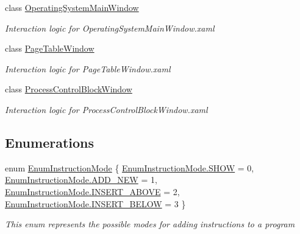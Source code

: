 \begin{DoxyCompactItemize}
class \hyperlink{class_c_p_u___o_s___simulator_1_1_operating_system_main_window}{Operating\+System\+Main\+Window}
\begin{DoxyCompactList}\small\item\em Interaction logic for Operating\+System\+Main\+Window.\+xaml \end{DoxyCompactList}\item 
class \hyperlink{class_c_p_u___o_s___simulator_1_1_page_table_window}{Page\+Table\+Window}
\begin{DoxyCompactList}\small\item\em Interaction logic for Page\+Table\+Window.\+xaml \end{DoxyCompactList}\item 
class \hyperlink{class_c_p_u___o_s___simulator_1_1_process_control_block_window}{Process\+Control\+Block\+Window}
\begin{DoxyCompactList}\small\item\em Interaction logic for Process\+Control\+Block\+Window.\+xaml \end{DoxyCompactList}\end{DoxyCompactItemize}
\subsection*{Enumerations}
\begin{DoxyCompactItemize}
\item 
enum \hyperlink{namespace_c_p_u___o_s___simulator_adc17a5a5e004084f05dc8e4d3f70e31f}{Enum\+Instruction\+Mode} \{ \hyperlink{namespace_c_p_u___o_s___simulator_adc17a5a5e004084f05dc8e4d3f70e31fac34fbad9a5e2a1d0c8f7cf8d226808b9}{Enum\+Instruction\+Mode.\+S\+H\+O\+W} = 0, 
\hyperlink{namespace_c_p_u___o_s___simulator_adc17a5a5e004084f05dc8e4d3f70e31faee3564492739daa789b12c0b8a2e6a25}{Enum\+Instruction\+Mode.\+A\+D\+D\+\_\+\+N\+E\+W} = 1, 
\hyperlink{namespace_c_p_u___o_s___simulator_adc17a5a5e004084f05dc8e4d3f70e31fa956b44f941eb5917f3cfcf0ba56db19b}{Enum\+Instruction\+Mode.\+I\+N\+S\+E\+R\+T\+\_\+\+A\+B\+O\+V\+E} = 2, 
\hyperlink{namespace_c_p_u___o_s___simulator_adc17a5a5e004084f05dc8e4d3f70e31fa0310160f3dc4ecec481c20ca1cf88be3}{Enum\+Instruction\+Mode.\+I\+N\+S\+E\+R\+T\+\_\+\+B\+E\+L\+O\+W} = 3
 \}\begin{DoxyCompactList}\small\item\em This enum represents the possible modes for adding instructions to a program \end{DoxyCompactList}
\end{DoxyCompactItemize}


